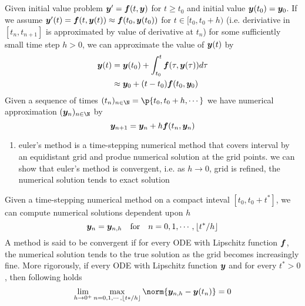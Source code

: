 \documentclass[11pt]{article}
\begin{document}
\subsection{}

\begin{definition*}
     Given initial value problem $\by' = \bf(t, \by)$ for $t\geq t_0$ and initial value $\by(t_0) = \by_0$. If we assume $\by'(t) = \bf(t, \by(t)) \approx \bf(t_0, \by(t_0))$ for $t\in [t_0,t_0+h)$ (i.e. deriviative in $[t_n, t_{n+1}]$ is approximated by value of derivative at $t_n$) for some sufficiently small time step $h>0$, we can approximate the value of $\by(t)$ by
    \begin{align*}
        \by(t) 
        &= \by(t_0) + \int_{t_0}^t \bf(\tau, \by(\tau)) d\tau  \\
        &\approx \by_0 + (t-t_0) \bf(t_0, \by_0)
    \end{align*}
    Given a sequence of times $(t_n)_{n\in\N} = \p{t_0, t_0+h,\cdots}$ we have numerical approximation $(\by_n)_{n\in\N}$ by 
    \[
        \by_{n+1} = \by_n + h\bf(t_n, \by_n)
    \]
    \begin{enumerate}
        \item {} euler's method is a time-stepping numerical method that covers interval by an equidistant grid and produe numerical solution at the grid points. we can show that euler's method is convergent, i.e. as $h\to 0$, grid is refined, the numerical solution tends to exact solution
    \end{enumerate}
\end{definition*}

\begin{definition*}
     Given a time-stepping numerical method on a compact inteval $[t_0, t_0+t^*]$, we can compute numerical solutions dependent upon $h$
    \[
        \by_n = \by_{n,h}
        \quad \text{for}
        \quad n = 0,1,\cdots,\lfloor t^*/h\rfloor    
    \]
    A method is said to be convergent if for every ODE with Lipschitz function $\bf$, the numerical solution tends to the true solution as the grid becomes increasingly fine. More rigorously, if every ODE with Lipschitz function $\by$ and for every $t^*>0$, then following holds 
    \[
        \lim_{h\to 0^+} \max_{n=0,1,\cdots,\lfloor t*/h\rfloor    } \norm{\by_{n,h} - \by(t_n)} = 0
    \]
\end{definition*}
\end{document}
